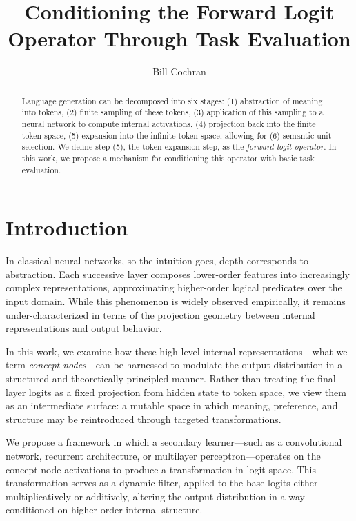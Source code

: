 \documentclass[12pt]{article}
\theoremstyle{plain}
\begin{document}
\title{Conditioning the Forward Logit Operator Through Task Evaluation}
\author{Bill Cochran}
\maketitle

\begin{abstract}
Language generation can be decomposed into six stages: (1) abstraction of meaning into tokens, 
(2) finite sampling of these tokens, (3) application of this sampling to a neural network to
compute internal activations, (4) projection back into the finite token space, (5)
expansion into the infinite token space, allowing for (6) semantic unit selection. We define 
step (5), the token expansion step, as the \emph{forward logit operator}. In this work, we 
propose a mechanism for conditioning this operator with basic task evaluation.
\end{abstract}


\section{Introduction}
In classical neural networks, so the intuition goes, depth corresponds to abstraction. Each 
successive layer composes lower-order features into increasingly complex representations, 
approximating higher-order logical predicates over the input domain. While this phenomenon 
is widely observed empirically, it remains under-characterized in terms of the projection 
geometry between internal representations and output behavior.

In this work, we examine how these high-level internal representations---what we term 
\emph{concept nodes}---can be harnessed to modulate the output distribution in a structured 
and theoretically principled manner. Rather than treating the final-layer logits as a fixed 
projection from hidden state to token space, we view them as an intermediate surface: a 
mutable space in which meaning, preference, and structure may be reintroduced through targeted transformations.

We propose a framework in which a secondary learner—such as a convolutional network, recurrent 
architecture, or multilayer perceptron—operates on the concept node activations to produce a 
transformation in logit space. This transformation serves as a dynamic filter, applied to the 
base logits either multiplicatively or additively, altering the output distribution in a way 
conditioned on higher-order internal structure.
\end{document}
